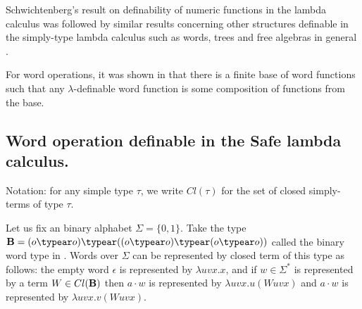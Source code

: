 Schwichtenberg's result on definability of numeric functions in the
lambda calculus was followed by similar results concerning other
structures definable in the simply-type lambda calculus such as
words, trees and free algebras in general
\cite{DBLP:journals/tcs/Leivant93,DBLP:journals/apal/Zaionc91,702481,DBLP:journals/tcs/Zaionc87}.

For word operations, it was shown in
\cite{DBLP:journals/tcs/Zaionc87} that there is a finite base of
word functions such that any $\lambda$-definable word function is
some composition of functions from the base.


\subsection{Word operation definable in the Safe lambda calculus.}
Notation: for any simple type $\tau$, we write $Cl(\tau)$ for the set of closed simply-terms of type $\tau$.


Let us fix an binary alphabet $\Sigma = \{0,1\}$.
Take the type $\boldbool = (o\typear o)\typear ((o\typear o)\typear (o\typear o))$ called the binary word type in \cite{DBLP:journals/tcs/Zaionc87}. Words over $\Sigma$ can be represented by closed term of this type as follows: the empty word $\epsilon$ is represented by $\lambda u v x.x$, and if $w\in \Sigma^*$ is represented by a term $W \in Cl(\mathbf{B})$ then $a \cdot w$ is represented by $\lambda u v x. u(W uvx)$ and $a \cdot w$ is represented by $\lambda u v x. v(W uvx)$.




